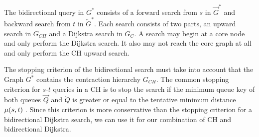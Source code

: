 The bidirectional query in $G^*$ consists of a forward search from $s$ in $\overrightarrow{G}^*$ and backward search from $t$ in $\overleftarrow{G}^*$. Each search consists of two parts, an upward search in $G_{CH}$ and a Dijkstra search in $G_C$. A search may begin at a core node and only perform the Dijkstra search. It also may not reach the core graph at all and only perform the CH upward search.

The stopping criterion of the bidirectional search must take into account that the Graph $G^*$ contains the contraction hierarchy $G_{CH}$. The common stopping criterion for $s$-$t$ queries in a CH is to stop the search if the minimum queue key of both queues $\overrightarrow{Q}$ and $\overleftarrow{Q}$ is greater or equal to the tentative minimum distance $\mu(s,t)$ \cite{geisberger:2012}. Since this criterion is more conservative than the stopping criterion for a bidirectional Dijkstra search, we can use it for our combination of CH and bidirectional Dijkstra.

